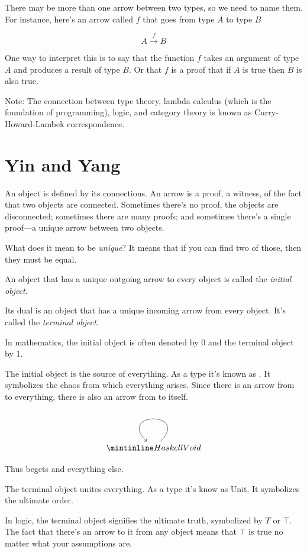 \documentclass[DaoFP]{subfiles}
\begin{document}
There may be more than one arrow between two types, so we need to name them. For instance, here's an arrow called $f$ that goes from type $A$ to type $B$

\[ A \xrightarrow f B \]

One way to interpret this is to say that the function $ f$ takes an argument of type $A$ and produces a result of type $B$. Or that $ f$ is a proof that if $A$ is true then $B$ is also true.

Note: The connection between type theory, lambda calculus (which is the foundation of programming), logic, and category theory is known as Curry-Howard-Lambek correspondence.

\section{Yin and Yang}

An object is defined by its connections. An arrow is a proof, a witness, of the fact that two objects are connected. Sometimes there's no proof, the objects are disconnected; sometimes there are many proofs; and sometimes there's a single proof---a unique arrow between two objects.

What does it mean to be \emph{unique}? It means that if you can find two of those, then they must be equal.

An object that has a unique outgoing arrow to every object is called the \emph{initial object}.

Its dual is an object that has a unique incoming arrow from every object. It's called the \emph{terminal object}. 

In mathematics, the initial object is often denoted by $0$ and the terminal object by $1$.

The initial object is the source of everything. As a type it's known as . It symbolizes the chaos from which everything arises. Since there is an arrow from  to everything, there is also an arrow from  to itself. 

\[
 \begin{tikzcd}
 \hask{Void}
 \arrow[loop]
 \end{tikzcd}
\]

Thus  begets  and everything else.

The terminal object unites everything. As a type it's know as Unit. It symbolizes the ultimate order.

In logic, the terminal object signifies the ultimate truth, symbolized by $T$ or $ \top$. The fact that there's an arrow to it from any object means that $ \top$ is true no matter what your assumptions are. 
\end{document}
